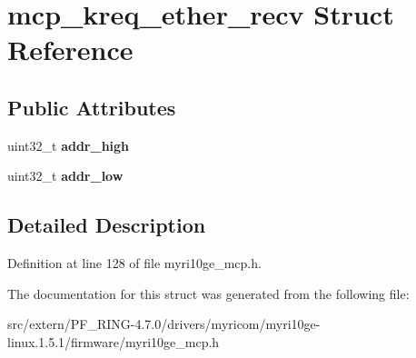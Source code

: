 \hypertarget{structmcp__kreq__ether__recv}{
\section{mcp\_\-kreq\_\-ether\_\-recv Struct Reference}
\label{structmcp__kreq__ether__recv}
}
\subsection*{Public Attributes}
\begin{DoxyCompactItemize}
\item 
\hypertarget{structmcp__kreq__ether__recv_ad84d7b3f7cb5b6a33289eb0eaad6f8c9}{
uint32\_\-t {\bfseries addr\_\-high}}
\label{structmcp__kreq__ether__recv_ad84d7b3f7cb5b6a33289eb0eaad6f8c9}

\item 
\hypertarget{structmcp__kreq__ether__recv_a8b64041f58aafd7e95eb62ac95717663}{
uint32\_\-t {\bfseries addr\_\-low}}
\label{structmcp__kreq__ether__recv_a8b64041f58aafd7e95eb62ac95717663}

\end{DoxyCompactItemize}


\subsection{Detailed Description}


Definition at line 128 of file myri10ge\_\-mcp.h.



The documentation for this struct was generated from the following file:\begin{DoxyCompactItemize}
\item 
src/extern/PF\_\-RING-\/4.7.0/drivers/myricom/myri10ge-\/linux.1.5.1/firmware/myri10ge\_\-mcp.h\end{DoxyCompactItemize}
